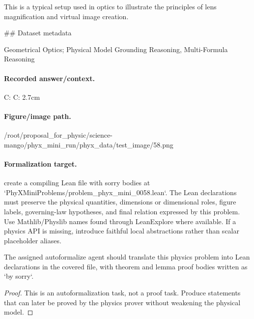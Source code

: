 This is a typical setup used in optics to illustrate the principles of lens magnification and virtual image creation.

\#\# Dataset metadata

Geometrical Optics; Physical Model Grounding Reasoning, Multi-Formula Reasoning

\paragraph{Recorded answer/context.}
C: C: 2.7cm

\paragraph{Figure/image path.}
/root/proposal\_for\_physic/science-mango/phyx\_mini\_run/phyx\_data/test\_image/58.png

\paragraph{Formalization target.}
create a compiling Lean file with sorry bodies at `PhyXMiniProblems/problem\_phyx\_mini\_0058.lean`. The Lean declarations must preserve the physical quantities, dimensions or dimensional roles, figure labels, governing-law hypotheses, and final relation expressed by this problem.
Use Mathlib/Physlib names found through LeanExplore where available. If a physics API is missing, introduce faithful local abstractions rather than scalar placeholder aliases.

\begin{theorem}
\label{thm:physics:phyx_mini_0058:target}
The assigned autoformalize agent should translate this physics problem into Lean declarations in the covered file, with theorem and lemma proof bodies written as `by sorry`.
\end{theorem}
\begin{proof}
This is an autoformalization task, not a proof task. Produce statements that can later be proved by the physics prover without weakening the physical model.
\end{proof}

